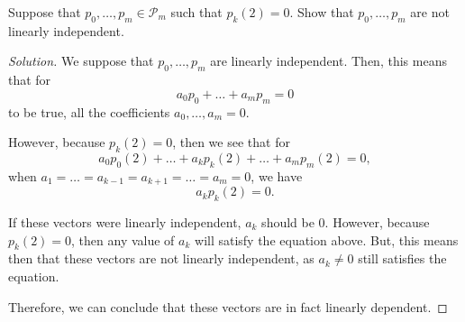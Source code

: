 \documentclass[openany]{book}
\newenvironment{solution}{\begin{proof}[Solution]}{\end{proof}}
\begin{document}
\begin{hw}
	Suppose that $p_{0}, \ldots, p_{m} \in \mathscr{P}_{m}$ such that $p_{k}(2) = 0$. Show that $p_{0}, \ldots, p_{m}$ are not linearly independent.
\end{hw}
\begin{solution}
	We suppose that $p_{0}, \ldots, p_{m}$ are linearly independent. Then, this means that for
	\begin{equation*}
		a_{0}p_{0} + \ldots + a_{m}p_{m} = 0
	\end{equation*}
	to be true, all the coefficients $a_{0}, \ldots, a_{m} = 0$.
	
	However, because $p_{k}(2) = 0$, then we see that for
	\begin{equation*}
		a_{0}p_{0}(2) + \ldots + a_{k}p_{k}(2) + \ldots + a_{m}p_{m}(2) = 0,
	\end{equation*}
	when $a_{1} = \ldots = a_{k-1} = a_{k+1} = \ldots = a_{m} = 0$, we have
	\begin{equation*}
		a_{k}p_{k}(2) = 0.
	\end{equation*}

	If these vectors were linearly independent, $a_{k}$ should be 0. However, because $p_{k}(2) = 0$, then any value of $a_{k}$ will satisfy the equation above. But, this means then that these vectors are not linearly independent, as $a_{k} \not= 0$ still satisfies the equation.
	
	Therefore, we can conclude that these vectors are in fact linearly dependent.
\end{solution}
\end{document}
